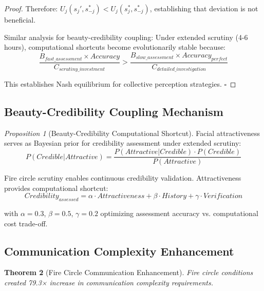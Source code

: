 \documentclass[12pt]{article}
\newtheorem{theorem}{Theorem}[section]
\newtheorem{proposition}[theorem]{Proposition}
\theoremstyle{definition}
\theoremstyle{remark}
\newtheorem{proposition}[theorem]{Proposition}
\begin{document}
\begin{proof}
Therefore: $U_j(s_j', s_{-j}^*) < U_j(s_j^*, s_{-j}^*)$, establishing that deviation is not beneficial.

Similar analysis for beauty-credibility coupling: Under extended scrutiny (4-6 hours), computational shortcuts become evolutionarily stable because:
\begin{equation}
\frac{B_{fast\_assessment} \times Accuracy}{C_{scrutiny\_investment}} > \frac{B_{slow\_assessment} \times Accuracy_{perfect}}{C_{detailed\_investigation}}
\end{equation}

This establishes Nash equilibrium for collective perception strategies. $\square$
\end{proof}

\subsection{Beauty-Credibility Coupling Mechanism}

\begin{proposition}[Beauty-Credibility Computational Shortcut]
\label{prop:beauty_credibility}
Facial attractiveness serves as Bayesian prior for credibility assessment under extended scrutiny:
\begin{equation}
P(Credible | Attractive) = \frac{P(Attractive | Credible) \cdot P(Credible)}{P(Attractive)}
\end{equation}
\end{proposition}

Fire circle scrutiny enables continuous credibility validation. Attractiveness provides computational shortcut:
\begin{equation}
Credibility_{assessed} = \alpha \cdot Attractiveness + \beta \cdot History + \gamma \cdot Verification
\end{equation}

with $\alpha = 0.3$, $\beta = 0.5$, $\gamma = 0.2$ optimizing assessment accuracy vs. computational cost trade-off.

\subsection{Communication Complexity Enhancement}

\begin{theorem}[Fire Circle Communication Enhancement]
\label{thm:communication_enhancement}
Fire circle conditions created 79.3× increase in communication complexity requirements.
\end{theorem}
\end{document}
